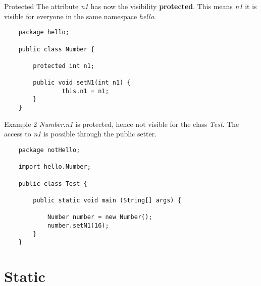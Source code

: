 \begin{frame}[fragile]{Protected}
	The attribute \emph{n1} has now the visibility \textbf{protected}. 
	This means \emph{n1} it is visible for everyone in the same namespace \emph{hello}.
	\begin{lstlisting}
	package hello;	
	
	public class Number {
	
	    protected int n1;
	    
	    public void setN1(int n1) {
	            this.n1 = n1;
	    }
	}
	\end{lstlisting}
\end{frame}
\begin{frame}[fragile]{Example 2}
	\emph{Number.n1} is protected, hence not visible for the class \emph{Test}.
	The access to \emph{n1} is possible through the public setter.
	\begin{lstlisting}
	package notHello;
	
	import hello.Number;	
	
	public class Test {

	    public static void main (String[] args) {
	
	        Number number = new Number();
	        number.setN1(16);
	    }
	}
	\end{lstlisting}
\end{frame}


%	

\section{Static}
